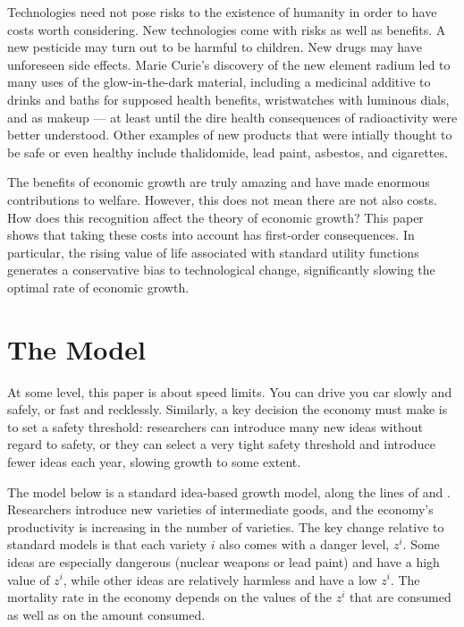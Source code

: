 \documentclass[12pt,twoside]{article}
\newcommand{\cn}[1]{\citet*{#1}}
\begin{document}
Technologies need not pose risks to the existence of humanity in order
to have costs worth considering. New technologies come with risks as
well as benefits. A new pesticide may turn out to be harmful to
children. New drugs may have unforeseen side effects. Marie Curie's
discovery of the new element radium led to many uses of the
glow-in-the-dark material, including a medicinal additive to drinks and
baths for supposed health benefits, wristwatches with luminous dials,
and as makeup --- at least until the dire health consequences of
radioactivity were better understood. Other examples of new products
that were intially thought to be safe or even healthy include
thalidomide, lead paint, asbestos, and cigarettes.

The benefits of economic growth are truly amazing and have made enormous
contributions to welfare. However, this does not mean there are not also
costs. How does this recognition affect the theory of economic growth?
This paper shows that taking these costs into account has first-order
consequences. In particular, the rising value of life associated with
standard utility functions generates a conservative bias to
technological change, significantly slowing the optimal rate of economic
growth.


\section{The Model}

At some level, this paper is about speed limits. You can drive you car
slowly and safely, or fast and recklessly. Similarly, a key decision the
economy must make is to set a safety threshold: researchers can
introduce many new ideas without regard to safety, or they can select a
very tight safety threshold and introduce fewer ideas each year, slowing
growth to some extent.

The model below is a standard idea-based growth model, along the lines
of \cn{Romer90} and \cn{JonesRND}. Researchers introduce new varieties
of intermediate goods, and the economy's productivity is increasing in
the number of varieties. The key change relative to standard models is
that each variety $i$ also comes with a danger level, $z^i$. Some ideas
are especially dangerous (nuclear weapons or lead paint) and have a high
value of $z^i$, while other ideas are relatively harmless and have a low
$z^i$. The mortality rate in the economy depends on the values of the
$z^i$ that are consumed as well as on the amount consumed.
\end{document}
